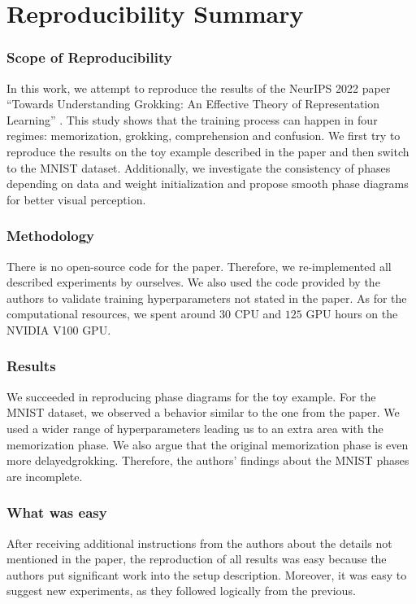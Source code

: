 \section*{\centering Reproducibility Summary}

\subsubsection*{Scope of Reproducibility}
In this work, we attempt to reproduce the results of the NeurIPS 2022 paper ``Towards Understanding Grokking: An Effective Theory of Representation Learning'' \cite{understanding_grokking}. This study shows that the training process can happen in four regimes: memorization, grokking, comprehension and confusion. We first try to reproduce the results on the toy example described in the paper and then switch to the MNIST dataset. Additionally, we investigate the consistency of phases depending on data and weight initialization and propose smooth phase diagrams for better visual perception.

\subsubsection*{Methodology}
There is no open-source code for the paper. Therefore, we re-implemented all described experiments by ourselves. We also used the code provided by the authors to validate training hyperparameters not stated in the paper. As for the computational resources, we spent around $30$ CPU and $125$ GPU hours on the NVIDIA V100 GPU.

\subsubsection*{Results}
We succeeded in reproducing phase diagrams for the toy example. For the MNIST dataset, we observed a behavior similar to the one from the paper. We used a wider range of hyperparameters leading us to an extra area with the memorization phase. We also argue that the original memorization phase is even more delayed\break grokking. Therefore, the authors' findings about the MNIST phases are incomplete.

\subsubsection*{What was easy}
After receiving additional instructions from the authors about the details not mentioned in the paper, the reproduction of all results was easy because the authors put significant work into the setup description. Moreover, it was easy to suggest new experiments, as they followed logically from the previous.

